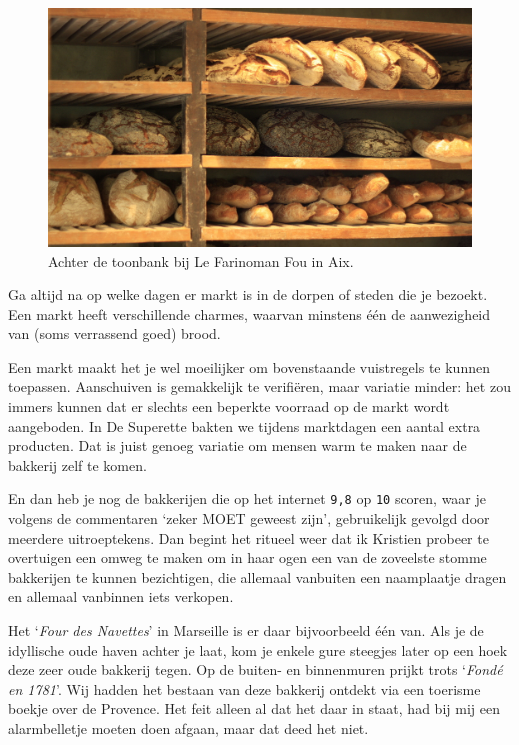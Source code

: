 \documentclass[
  11pt,
  dutch,
]{memoir}
\begin{document}
\begin{figure}
    \centering
    \includegraphics{img/bw/farinoman.jpg}
    \caption{Achter de toonbank bij Le Farinoman Fou in Aix.}
\end{figure}

Ga altijd na op welke dagen er markt is in de dorpen of steden die je
bezoekt. Een markt heeft verschillende charmes, waarvan minstens één de
aanwezigheid van (soms verrassend goed) brood.

Een markt maakt het je wel moeilijker om bovenstaande vuistregels te
kunnen toepassen. Aanschuiven is gemakkelijk te verifiëren, maar
variatie minder: het zou immers kunnen dat er slechts een beperkte
voorraad op de markt wordt aangeboden. In De Superette bakten we tijdens
marktdagen een aantal extra producten. Dat is juist genoeg variatie om
mensen warm te maken naar de bakkerij zelf te komen.

En dan heb je nog de bakkerijen die op het internet \texttt{9,8} op
\texttt{10} scoren, waar je volgens de commentaren `zeker MOET geweest
zijn', gebruikelijk gevolgd door meerdere uitroeptekens. Dan begint het
ritueel weer dat ik Kristien probeer te overtuigen een omweg te maken om
in haar ogen een van de zoveelste stomme bakkerijen te kunnen
bezichtigen, die allemaal vanbuiten een naamplaatje dragen en allemaal
vanbinnen iets verkopen.

Het `\emph{Four des Navettes}' in Marseille is er daar bijvoorbeeld één
van. Als je de idyllische oude haven achter je laat, kom je enkele gure
steegjes later op een hoek deze zeer oude bakkerij tegen. Op de buiten-
en binnenmuren prijkt trots `\emph{Fondé en 1781}'. Wij hadden het
bestaan van deze bakkerij ontdekt via een toerisme boekje over de
Provence. Het feit alleen al dat het daar in staat, had bij mij een
alarmbelletje moeten doen afgaan, maar dat deed het niet.
\end{document}

